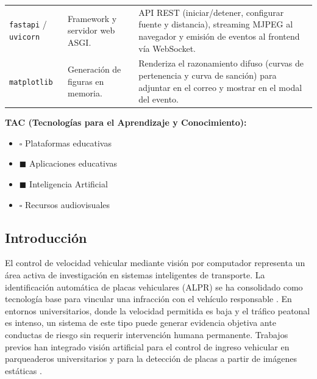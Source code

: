 \documentclass[11pt]{article}
\begin{document}
\begin{table}[H]
\begin{tabular}{>{\raggedright\arraybackslash}p{2.6cm}
                    >{\raggedright\arraybackslash}p{4.2cm}
                    >{\raggedright\arraybackslash}p{7.0cm}}
        \texttt{fastapi} / \texttt{uvicorn} & Framework y servidor web ASGI. &
        API REST (iniciar/detener, configurar fuente y distancia), streaming MJPEG al
        navegador y emisión de eventos al frontend vía WebSocket. \\

        \texttt{matplotlib} & Generación de figuras en memoria. & Renderiza el
        razonamiento difuso (curvas de pertenencia y curva de sanción) para adjuntar
        en el correo y mostrar en el modal del evento. \\
        \bottomrule
    \end{tabular}
\end{table}

\textbf{TAC (Tecnologías para el Aprendizaje y Conocimiento):}
\begin{itemize}
    \item[] $\square$ Plataformas educativas
    \item[] $\blacksquare$ Aplicaciones educativas
    \item[] $\blacksquare$ Inteligencia Artificial
    \item[] $\square$ Recursos audiovisuales
\end{itemize}

\subsection{Introducción}
El control de velocidad vehicular mediante visión por computador representa un área
activa de investigación en sistemas inteligentes de transporte. La identificación
automática de placas vehiculares (ALPR) se ha consolidado como tecnología base para
vincular una infracción con el vehículo responsable \cite{alpr_survey}. En entornos
universitarios, donde la velocidad permitida es baja y el tráfico peatonal es intenso,
un sistema de este tipo puede generar evidencia objetiva ante conductas de riesgo sin
requerir intervención humana permanente. Trabajos previos han integrado visión
artificial para el control de ingreso vehicular en parqueaderos universitarios
\cite{alpr_ups} y para la detección de placas a partir de imágenes estáticas
\cite{alpr_loja}.
\end{document}
